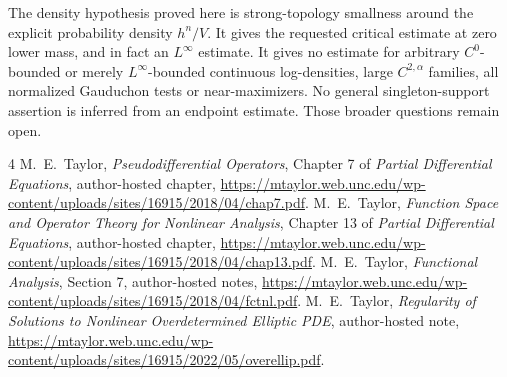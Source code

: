 \documentclass[11pt]{article}
\begin{document}
The density hypothesis proved here is strong-topology smallness around
the explicit probability density $h^n/V$. It gives the requested
critical estimate at zero lower mass, and in fact an $L^\infty$ estimate.
It gives no estimate for arbitrary $C^0$-bounded or merely
$L^\infty$-bounded continuous log-densities, large $C^{2,\alpha}$
families, all normalized Gauduchon tests or near-maximizers. No general
singleton-support assertion is inferred from an endpoint estimate.
Those broader questions remain open.
\begin{thebibliography}{4}
 M.~E.~Taylor,
\emph{Pseudodifferential Operators}, Chapter 7 of
\emph{Partial Differential Equations}, author-hosted chapter,
\url{https://mtaylor.web.unc.edu/wp-content/uploads/sites/16915/2018/04/chap7.pdf}.
 M.~E.~Taylor,
\emph{Function Space and Operator Theory for Nonlinear Analysis},
Chapter 13 of \emph{Partial Differential Equations}, author-hosted chapter,
\url{https://mtaylor.web.unc.edu/wp-content/uploads/sites/16915/2018/04/chap13.pdf}.
 M.~E.~Taylor,
\emph{Functional Analysis}, Section 7,
author-hosted notes,
\url{https://mtaylor.web.unc.edu/wp-content/uploads/sites/16915/2018/04/fctnl.pdf}.
 M.~E.~Taylor,
\emph{Regularity of Solutions to Nonlinear Overdetermined Elliptic PDE},
author-hosted note,
\url{https://mtaylor.web.unc.edu/wp-content/uploads/sites/16915/2022/05/overellip.pdf}.
\end{thebibliography}
\end{document}
